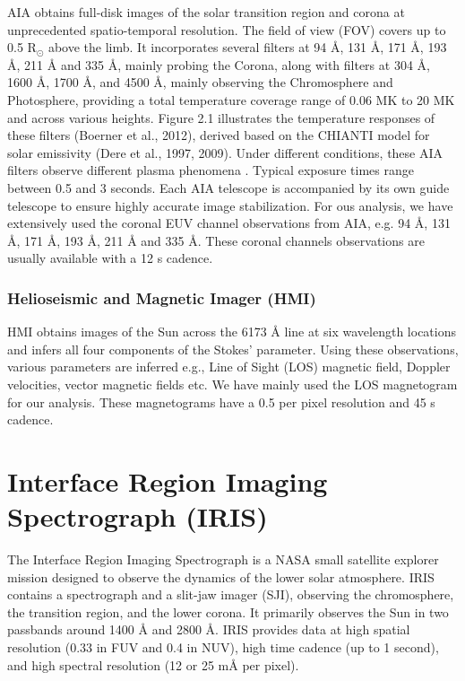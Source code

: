 AIA \citep{aia} obtains full-disk images of the solar transition region and corona at unprecedented spatio-temporal resolution. The field of view (FOV) covers up to 0.5 $\mathrm{R_{\odot}}$ above the limb. It incorporates several filters at 94 {\AA}, 131 {\AA}, 171 {\AA}, 193 {\AA}, 211 {\AA} and 335 {\AA}, mainly probing the Corona, along with filters at 304 {\AA}, 1600 {\AA}, 1700 {\AA}, and 4500 {\AA}, mainly observing the Chromosphere and Photosphere, providing a total temperature coverage range of 0.06 MK to 20 MK and across various heights. Figure 2.1 illustrates the temperature responses of these filters (Boerner et al., 2012), derived based on the CHIANTI model for solar emissivity (Dere et al., 1997, 2009). Under different conditions, these AIA filters observe different plasma phenomena \citep{o'dwyer10}. Typical exposure times range between 0.5 and 3 seconds. Each AIA telescope is accompanied by its own guide telescope to ensure highly accurate image stabilization. For ous analysis, we have extensively used the coronal EUV channel observations from AIA, e.g. 94 {\AA}, 131 {\AA}, 171 {\AA}, 193 {\AA}, 211 {\AA} and 335 {\AA}. These coronal channels observations are usually available with a 12 s cadence.

\subsubsection{Helioseismic and Magnetic Imager (HMI)}

HMI \citep{hmi} obtains images of the Sun across the  6173 {\AA} line at six wavelength locations and infers all four components of the Stokes' parameter. Using these observations, various parameters are inferred e.g., Line of Sight (LOS) magnetic field, Doppler velocities, vector magnetic fields etc. We have mainly used the LOS magnetogram for our analysis. These magnetograms have a 0.5{\arcsec} per pixel resolution and 45 s cadence.

\section{Interface Region Imaging Spectrograph (IRIS)}

The Interface Region Imaging Spectrograph \citep[IRIS;][]{iris} is a NASA small satellite explorer mission designed to observe the dynamics of the lower solar atmosphere. IRIS contains a spectrograph and a slit-jaw imager (SJI), observing the chromosphere, the transition region, and the lower corona. It primarily observes the Sun in two passbands around 1400 {\AA} and 2800 {\AA}. IRIS provides data at high spatial resolution (0.33 {\arcsec} in FUV and 0.4 {\arcsec} in NUV), high time cadence (up to 1 second), and high spectral resolution (12 or 25 m{\AA} per pixel).

